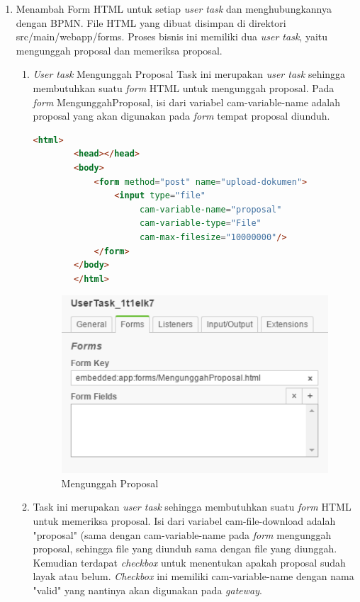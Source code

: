 \begin{enumerate}
	\item Menambah Form HTML untuk setiap \textit{user task} dan menghubungkannya dengan BPMN. File HTML yang dibuat disimpan di direktori src/main/webapp/forms. Proses bisnis ini memiliki dua \textit{user task}, yaitu mengunggah proposal dan memeriksa proposal. 
	
\begin{enumerate}
	\item \textit{User task} Mengunggah Proposal
	Task ini merupakan \textit{user task} sehingga membutuhkan suatu \textit{form} HTML untuk mengunggah proposal. Pada \textit{form} MengunggahProposal, isi dari variabel cam-variable-name adalah proposal yang akan digunakan pada \textit{form} tempat proposal diunduh.

	
	\begin{lstlisting}[language=html,basicstyle=\tiny,caption=MengunggahProposal.html]
		<html>
		<head></head>
		<body>
			<form method="post" name="upload-dokumen">
				<input type="file"
					 cam-variable-name="proposal" 
					 cam-variable-type="File"
					 cam-max-filesize="10000000"/>
			</form>
		</body>
		</html>
	\end{lstlisting}
	
		\begin{figure}[H]
			\centering
			\includegraphics[scale=1]{Gambar/Bab-3/Kasus1/2form}
			\caption{Mengunggah Proposal} 
			\label{fig:pengajuanproposal_mengunggahproposalform}
	\end{figure}


\item Task ini merupakan \textit{user task} sehingga membutuhkan suatu \textit{form} HTML untuk memeriksa proposal. Isi dari variabel cam-file-download adalah "proposal" (sama dengan cam-variable-name pada \textit{form} mengunggah proposal, sehingga file yang diunduh sama dengan file yang diunggah. Kemudian terdapat \textit{checkbox} untuk menentukan apakah proposal sudah layak atau belum. \textit{Checkbox} ini memiliki cam-variable-name dengan nama "valid" yang nantinya akan digunakan pada \textit{gateway}.


\end{enumerate}
\end{enumerate}
